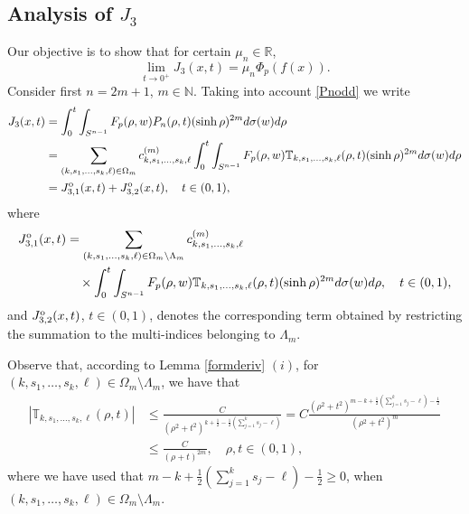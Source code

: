 \documentclass[a4paper,10pt, reqno]{amsart}
\theoremstyle{definition}
\theoremstyle{remark}
\numberwithin{equation}{section}
\begin{document}
{\subsection{Analysis of $J_3$} Our objective is to show that for certain $\mu_n\in \mathbb R$,
\begin{equation}\label{J3}
\lim_{t\rightarrow 0^+}J_3(x,t)=\mu_n \Phi _p(f(x)).
\end{equation}
Consider first $n=2m+1$, $m\in \mathbb N$. Taking into account \eqref{Pnodd} we write
\begin{align*}
J_3(x,t)&=\int_0^t\int_{S^{n-1}}F_p(\rho ,w)P_n(\rho ,t)(\sinh \rho )^{2m}d\sigma (w)d\rho\\
&=\sum_{(k,s_1,\ldots,s_k,\ell)\in \Omega_m}c_{k,s_1,\ldots, s_k,\ell}^{(m)}\int_0^t\int_{S^{n-1}}F_p(\rho , w)\mathbb T_{k,s_1,\ldots,s_k,\ell}(\rho, t)(\sinh \rho )^{2m}d\sigma(w)d\rho\\
&=J_{3,1}^{\rm o}(x,t)+J_{3,2}^{\rm o}(x,t),\quad t\in (0,1),
\end{align*}
where
\begin{align*}
J_{3,1}^{\rm o}(x,t)&=\sum_{(k,s_1,\ldots,s_k,\ell)\in \Omega_m\setminus \Lambda _m}c_{k,s_1,\ldots, s_k,\ell}^{(m)}\\
&\quad \times\int_0^t\int_{S^{n-1}}F_p(\rho , w)\mathbb T_{k,s_1,\ldots,s_k,\ell}(\rho, t)(\sinh \rho )^{2m}d\sigma(w)d\rho,\quad t\in (0,1),
\end{align*}
and $J_{3,2}^{\rm o}(x,t)$, $t\in (0,1)$, denotes the corresponding term obtained by restricting the summation to the multi-indices belonging to $\Lambda _m$. 

Observe that, according to Lemma \ref{formderiv} $(i)$, for $(k,s_1,\ldots, s_k,\ell )\in \Omega_m\setminus \Lambda _m$, we have that
\begin{align}\label{cotabbT}
    |\mathbb T_{k,s_1,\ldots, s_k,\ell}(\rho,t)|&\leq \frac{C}{(\rho ^2+t^2)^{k+\frac{1}{2}-\frac{1}{2}(\sum_{j=1}^ks_j-\ell)}}=C\frac{(\rho ^2+t^2)^{m-k+\frac{1}{2}(\sum_{j=1}^ks_j-\ell)-\frac{1}{2}}}{(\rho ^2+t^2)^m}\nonumber\\
    &\leq \frac{C}{(\rho +t)^{2m}}, \quad \rho, t\in (0,1),
\end{align}
where we have used that $m-k+\frac{1}{2}(\sum_{j=1}^ks_j-\ell)-\frac{1}{2}\geq 0$, when $(k,s_1,\ldots, s_k,\ell )\in \Omega_m\setminus \Lambda _m$.

}
\end{document}
